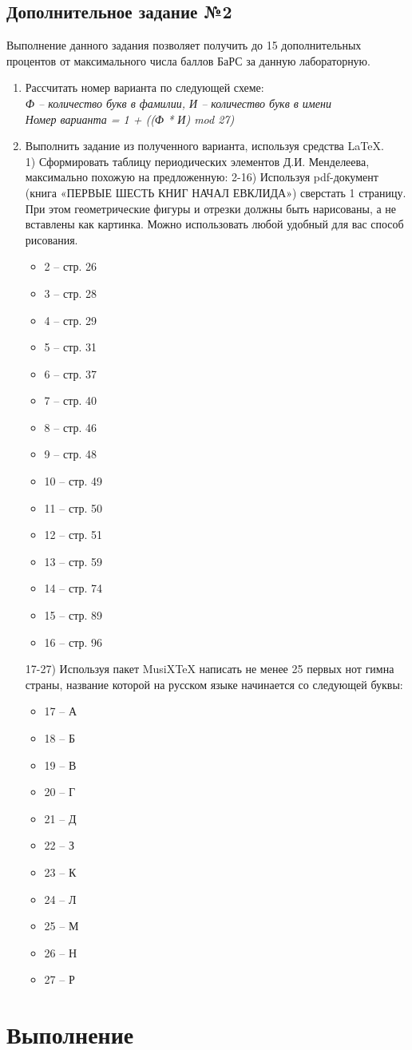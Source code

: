 \documentclass[a4paper]{article}
\begin{document}
	\subsection{Дополнительное задание №2}
		Выполнение данного задания позволяет получить до 15 дополнительных
		процентов от максимального числа баллов БаРС за данную лабораторную.
		\begin{enumerate}[label=\arabic*.]
			\item Рассчитать номер варианта по следующей схеме:\\
			\textit{Ф – количество букв в фамилии, И – количество букв в имени}\\
			\textit{Номер варианта = 1 + ((Ф * И) mod 27)}
			\item Выполнить задание из полученного варианта, используя средства LaTeX.\\
			1) Сформировать таблицу периодических элементов
			Д.И.
			Менделеева,
			максимально похожую на предложенную:
			2-16) Используя pdf-документ (книга «ПЕРВЫЕ ШЕСТЬ КНИГ НАЧАЛ
			ЕВКЛИДА») сверстать 1 страницу. При этом геометрические фигуры и
			отрезки должны быть нарисованы, а не вставлены как картинка. Можно
			использовать любой удобный для вас способ рисования.
			\begin{itemize}
				\item2 – стр. 26
				\item3 – стр. 28
				\item4 – стр. 29
				\item5 – стр. 31
				\item6 – стр. 37
				\item7 – стр. 40
				\item8 – стр. 46
				\item9 – стр. 48
				\item10 – стр. 49
				\item11 – стр. 50
				\item12 – стр. 51
				\item13 – стр. 59
				\item14 – стр. 74
				\item15 – стр. 89
				\item16 – стр. 96
			\end{itemize}
			17-27) Используя пакет MusiXTeX написать не менее 25 первых нот гимна страны,
			название которой на русском языке начинается со следующей буквы:
			\begin{itemize}
				\item17 – А
				\item18 – Б
				\item19 – В
				\item20 – Г
				\item21 – Д
				\item22 – З
				\item23 – К
				\item24 – Л
				\item25 – М
				\item26 – Н
				\item27 – Р
			\end{itemize}
		\end{enumerate}
	\newpage
	\section{Выполнение}
\end{document}
